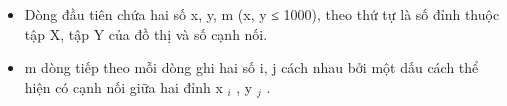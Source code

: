 \begin{itemize}
	\item     Dòng đầu tiên chứa hai số x, y, m  (x, y ≤ 1000), theo thứ tự là số đỉnh thuộc tập X, tập Y của đồ thị và số cạnh nối.   
	\item     m dòng tiếp theo mỗi dòng ghi hai số i, j cách nhau bởi một dấu cách thể hiện có cạnh nối giữa hai đỉnh x    $_     i    $    , y    $_     j    $    .   
\end{itemize}